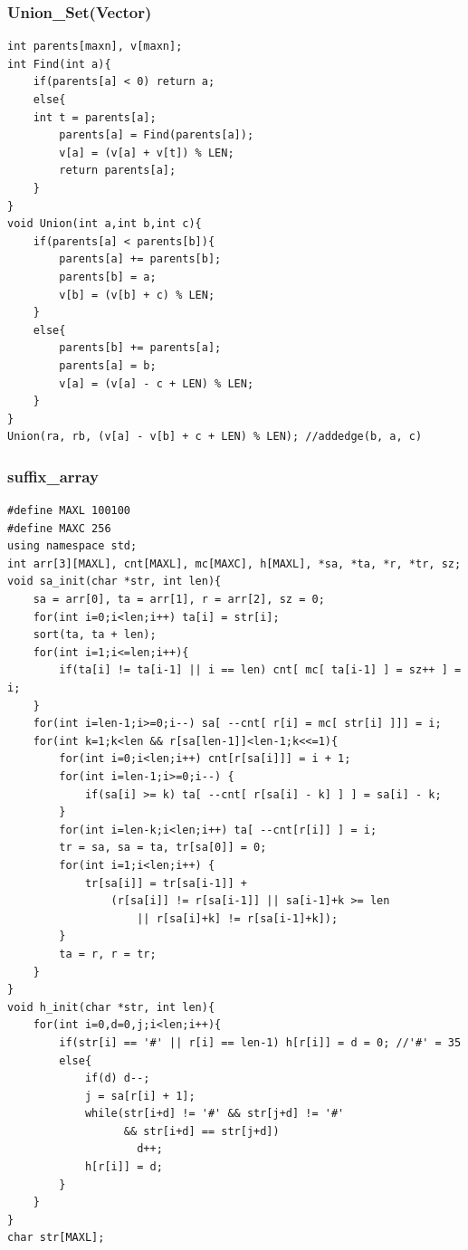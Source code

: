 \documentclass[a4paper]{article}
\begin{document}
\begin{CJK*}{UTF8}{gbsn}
\begin{multicols}{3}
\begin{flushleft}
\subsubsection{Union\_Set(Vector)}
\begin{lstlisting}
int parents[maxn], v[maxn];
int Find(int a){
    if(parents[a] < 0) return a;
    else{
	int t = parents[a];
        parents[a] = Find(parents[a]);
        v[a] = (v[a] + v[t]) % LEN;
        return parents[a];
    }
}
void Union(int a,int b,int c){
    if(parents[a] < parents[b]){
        parents[a] += parents[b];
        parents[b] = a;
        v[b] = (v[b] + c) % LEN;
    }
    else{
        parents[b] += parents[a];
        parents[a] = b;
        v[a] = (v[a] - c + LEN) % LEN;
    }
}
Union(ra, rb, (v[a] - v[b] + c + LEN) % LEN); //addedge(b, a, c)
\end{lstlisting}


\subsubsection{suffix\_array}
\begin{lstlisting}
#define MAXL 100100
#define MAXC 256
using namespace std;
int arr[3][MAXL], cnt[MAXL], mc[MAXC], h[MAXL], *sa, *ta, *r, *tr, sz;
void sa_init(char *str, int len){
    sa = arr[0], ta = arr[1], r = arr[2], sz = 0;
    for(int i=0;i<len;i++) ta[i] = str[i];
    sort(ta, ta + len);
    for(int i=1;i<=len;i++){
        if(ta[i] != ta[i-1] || i == len) cnt[ mc[ ta[i-1] ] = sz++ ] = i;
    }
    for(int i=len-1;i>=0;i--) sa[ --cnt[ r[i] = mc[ str[i] ]]] = i;
    for(int k=1;k<len && r[sa[len-1]]<len-1;k<<=1){
        for(int i=0;i<len;i++) cnt[r[sa[i]]] = i + 1;
        for(int i=len-1;i>=0;i--) {
            if(sa[i] >= k) ta[ --cnt[ r[sa[i] - k] ] ] = sa[i] - k;
        }
        for(int i=len-k;i<len;i++) ta[ --cnt[r[i]] ] = i;
        tr = sa, sa = ta, tr[sa[0]] = 0;
        for(int i=1;i<len;i++) {
            tr[sa[i]] = tr[sa[i-1]] +
                (r[sa[i]] != r[sa[i-1]] || sa[i-1]+k >= len
                    || r[sa[i]+k] != r[sa[i-1]+k]);
        }
        ta = r, r = tr;
    }
}
void h_init(char *str, int len){
    for(int i=0,d=0,j;i<len;i++){
        if(str[i] == '#' || r[i] == len-1) h[r[i]] = d = 0; //'#' = 35
        else{
            if(d) d--;
            j = sa[r[i] + 1];
            while(str[i+d] != '#' && str[j+d] != '#'
                  && str[i+d] == str[j+d])
                    d++;
            h[r[i]] = d;
        }
    }
}
char str[MAXL];
\end{lstlisting}


\end{flushleft}
\end{multicols}
\end{CJK*}
\end{document}
